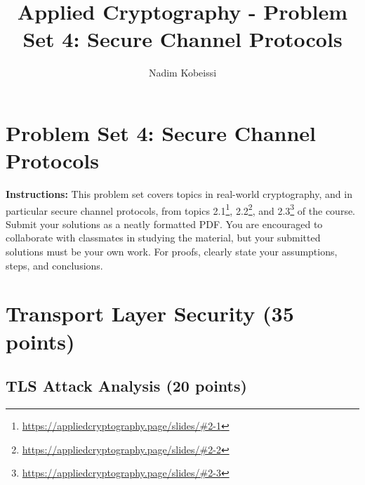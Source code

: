\documentclass[10pt,a4paper,american]{exam}
\title{Applied Cryptography - Problem Set 4: Secure Channel Protocols}
\author{Nadim Kobeissi}
\begin{document}
\classhandoutheader
\section*{Problem Set 4: Secure Channel Protocols}

\begin{tcolorbox}[colframe=OliveGreen!30!white,colback=OliveGreen!5!white]
	\textbf{Instructions:} This problem set covers topics in real-world cryptography, and in particular secure channel protocols, from topics 2.1\footnote{\url{https://appliedcryptography.page/slides/\#2-1}}, 2.2\footnote{\url{https://appliedcryptography.page/slides/\#2-2}}, and 2.3\footnote{\url{https://appliedcryptography.page/slides/\#2-3}} of the course. Submit your solutions as a neatly formatted PDF. You are encouraged to collaborate with classmates in studying the material, but your submitted solutions must be your own work. For proofs, clearly state your assumptions, steps, and conclusions.
\end{tcolorbox}

\section{Transport Layer Security (35 points)}

\subsection{TLS Attack Analysis (20 points)}
\end{document}

